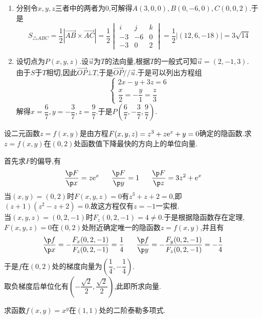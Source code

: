 \documentclass{ctexart}
\begin{document}
\begin{solution}
    \begin{enumerate}[label=\tbf{(\arabic*)}]
        \item 分别令$x,y,z$三者中的两者为$0$,可解得$A(3,0,0),B(0,-6,0),C(0,0,2)$.于是
            \[S_{\triangle ABC}=\dfrac{1}{2}\left|\overrightarrow{AB}\times\overrightarrow{AC}\right|=\dfrac12\begin{vmatrix}
                i&j&k\\-3&-6&0\\-3&0&2
            \end{vmatrix}=\dfrac12\left|(12,6,-18)\right|=3\sqrt{14}\]
        \item 设切点为$P(x,y,z)$.设$\vec{u}$为$T$的法向量,根据$T$的一般式可知$\vec{u}=(2,-1,3)$.\\
            由于$S$于$T$相切,因此$\overrightarrow{OP}\bot T$,于是$\overrightarrow{OP}//\vec{u}$.于是可以列出方程组
            \[\left\{\begin{array}{l}
                2x-y+3z=6\\
                \dfrac x2=-\dfrac y1=\dfrac z3
            \end{array}\right.\]
            解得$x=\dfrac67,y=-\dfrac3{7},z=\dfrac9{7}$.于是$P\left(\dfrac67,-\dfrac37,\dfrac97\right)$.
    \end{enumerate}
\end{solution}
\begin{problem}[4.(10\songti{分})]
    设二元函数$z=f(x,y)$是由方程$F(x,y,z)=z^3+z\mathrm{e}^x+y=0$确定的隐函数.求$z=f(x,y)$在$(0,2)$处函数值下降最快的方向上的单位向量.
\end{problem}
\begin{solution}
    首先求$F$的偏导,有\[\dfrac{\p F}{\p x}=z\e^x\ \ \ \ \ \dfrac{\p F}{\p y}=1\ \ \ \ \ \dfrac{\p F}{\p z}=3z^2+\e^x\]
    当$(x,y)=(0,2)$时$F(x,y,z)=0$有$z^3+z+2=0$,即$(z+1)(z^2-z+2)=0$.故这方程仅有$z=-1$一实根.\\
    当$(x,y,z)=(0,2,-1)$时$F_z(0,2,-1)=4\neq0$.于是根据隐函数存在定理,$F(x,y,z)=0$在$(0,2)$处附近确定唯一的隐函数$z=f(x,y)$,并且有
    \[\dfrac{\p f}{\p x}=-\dfrac{F_x(0,2,-1)}{F_z(0,2,-1)}=\dfrac14\ \ \ \ \ \dfrac{\p f}{\p y}=-\dfrac{F_y(0,2,-1)}{F_z(0,2,-1)}=-\dfrac14\]
    于是$f$在$(0,2)$处的梯度向量为$\left(\dfrac14,-\dfrac14\right)$.\\
    取负梯度后单位化有$\left(-\dfrac{\sqrt2}{2},\dfrac{\sqrt2}{2}\right)$,此即所求向量.
\end{solution}
\begin{problem}[5.(10\songti{分})]
    求函数$f(x,y)=x^y$在$(1,1)$处的二阶泰勒多项式.
\end{problem}
\end{document}
